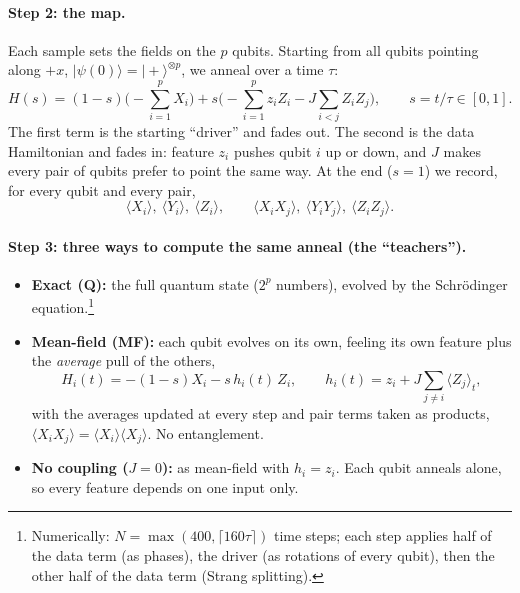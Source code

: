 \documentclass[11pt]{article}
\begin{document}
\paragraph{Step 2: the map.} Each sample sets the fields on the $p$ qubits. Starting from all qubits pointing
along $+x$, $|\psi(0)\rangle=|+\rangle^{\otimes p}$, we anneal over a time $\tau$:
\begin{equation}
H(s)=(1-s)\Big(-\sum_{i=1}^{p}X_i\Big)+s\Big(-\sum_{i=1}^{p}z_iZ_i-J\sum_{i<j}Z_iZ_j\Big),\qquad s=t/\tau\in[0,1].
\end{equation}
The first term is the starting ``driver'' and fades out. The second is the data Hamiltonian and fades in:
feature $z_i$ pushes qubit $i$ up or down, and $J$ makes every pair of qubits prefer to point the same way.
At the end ($s=1$) we record, for every qubit and every pair,
\begin{equation}
\langle X_i\rangle,\ \langle Y_i\rangle,\ \langle Z_i\rangle,\qquad
\langle X_iX_j\rangle,\ \langle Y_iY_j\rangle,\ \langle Z_iZ_j\rangle .
\end{equation}

\paragraph{Step 3: three ways to compute the same anneal (the ``teachers'').}
\begin{itemize}\setlength{\itemsep}{2pt}
\item \textbf{Exact (Q):} the full quantum state ($2^p$ numbers), evolved by the Schr\"odinger
equation.\footnote{Numerically: $N=\max(400,\lceil160\tau\rceil)$ time steps; each step applies half of the
data term (as phases), the driver (as rotations of every qubit), then the other half of the data term
(Strang splitting).}
\item \textbf{Mean-field (MF):} each qubit evolves on its own, feeling its own feature plus the
\emph{average} pull of the others,
\begin{equation}
H_i(t)=-(1-s)X_i-s\,h_i(t)\,Z_i,\qquad h_i(t)=z_i+J\sum_{j\ne i}\langle Z_j\rangle_t ,
\end{equation}
with the averages updated at every step and pair terms taken as products,
$\langle X_iX_j\rangle=\langle X_i\rangle\langle X_j\rangle$. No entanglement.
\item \textbf{No coupling ($J=0$):} as mean-field with $h_i=z_i$. Each qubit anneals alone, so every feature
depends on one input only.
\end{itemize}
\end{document}
